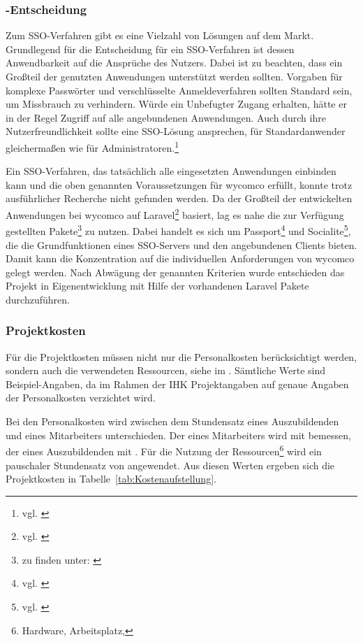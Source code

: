 \subsubsection{-Entscheidung}
\label{sec:MakeOrBuyEntscheidung}

Zum \ac{SSO}-Verfahren gibt es eine Vielzahl von Lösungen auf dem Markt.
Grundlegend für die Entscheidung für ein \ac{SSO}-Verfahren ist dessen Anwendbarkeit auf die Ansprüche des Nutzers. Dabei ist zu beachten, dass ein Großteil der genutzten Anwendungen unterstützt werden sollten. Vorgaben für komplexe Passwörter und verschlüsselte Anmeldeverfahren sollten Standard sein, um Missbrauch zu verhindern. Würde ein Unbefugter Zugang erhalten, hätte er in der Regel Zugriff auf alle angebundenen Anwendungen. Auch durch ihre Nutzerfreundlichkeit sollte eine \acs{SSO}-Lösung ansprechen, für Standardanwender gleichermaßen wie für Administratoren.\footnote{vgl. \cite{computerwoche}}

Ein \ac{SSO}-Verfahren, das tatsächlich alle eingesetzten Anwendungen einbinden kann und die oben genannten Voraussetzungen für wycomco erfüllt, konnte trotz ausführlicher Recherche nicht gefunden werden. Da der Großteil der entwickelten Anwendungen bei wycomco auf Laravel\footnote{vgl. \cite{Laravel}} basiert, lag es nahe die zur Verfügung gestellten Pakete\footnote{zu finden unter: \cite{pakete}} zu nutzen. Dabei handelt es sich um Passport\footnote{vgl. \cite{Passport}} und Socialite\footnote{vgl. \cite{Socialite}}, die die Grundfunktionen eines SSO-Servers und den angebundenen Clients bieten. Damit kann die Konzentration auf die individuellen Anforderungen von wycomco gelegt werden. Nach Abwägung der genannten Kriterien wurde entschieden das Projekt in Eigenentwicklung mit Hilfe der vorhandenen Laravel Pakete durchzuführen.

\subsubsection{Projektkosten}
\label{sec:Projektkosten}

Für die Projektkosten müssen nicht nur die Personalkosten berücksichtigt werden, sondern auch die verwendeten Ressourcen, siehe im . Sämtliche Werte sind Beispiel-Angaben, da im Rahmen der IHK Projektangaben auf genaue Angaben der Personalkosten verzichtet wird. 

Bei den Personalkosten wird zwischen dem Stundensatz eines Auszubildenden und eines Mitarbeiters unterschieden. Der eines Mitarbeiters wird mit  bemessen, der eines Auszubildenden mit .
Für die Nutzung der Ressourcen\footnote{Hardware, Arbeitsplatz, \etc} wird ein pauschaler Stundensatz von  angewendet.
Aus diesen Werten ergeben sich die Projektkosten in Tabelle~\ref{tab:Kostenaufstellung}.

